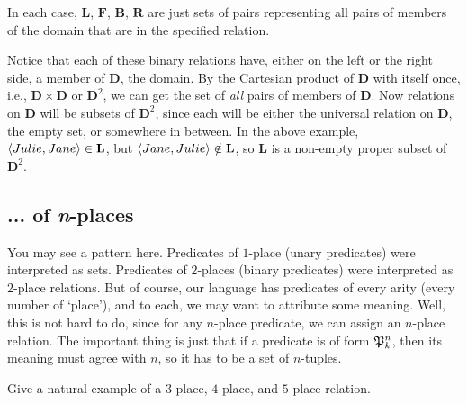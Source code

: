 In each case, $\mathbf{L}$, $\mathbf{F}$, $\mathbf{B}$, $\mathbf{R}$ are just sets of pairs representing all pairs of members of the domain that are in the specified relation. 

Notice that each of these binary relations have, either on the left or the right side, a member of $\mathbf{D}$, the domain. By the Cartesian product of $\mathbf{D}$ with itself once, i.e., $\mathbf{D} \times \mathbf{D}$ or $\mathbf{D}^2$, we can get the set of \textit{all} pairs of members of $\mathbf{D}$. Now relations on $\mathbf{D}$ will be subsets of $\mathbf{D}^2$, since each will be either the universal relation on $\mathbf{D}$, the empty set, or somewhere in between. In the above example, $\langle Julie, Jane\rangle \in \mathbf{L}$, but $\langle Jane, Julie\rangle \notin \mathbf{L}$, so $\mathbf{L}$ is a non-empty proper subset of $\mathbf{D}^2$.


\subsection{... of \emph{n}-places}

You may see a pattern here. Predicates of $1$-place (unary predicates) were interpreted as sets. Predicates of $2$-places (binary predicates) were interpreted as $2$-place relations. But of course, our language has predicates of every arity (every number of `place'), and to each, we may want to attribute some meaning. Well, this is not hard to do, since for any $n$-place predicate, we can assign an $n$-place relation. The important thing is just that if a predicate is of form $\mathfrak{P}^{n}_{k}$, then its meaning must agree with $n$, so it has to be a set of $n$-tuples. 

\begin{exc}
Give a natural example of a $3$-place, $4$-place, and $5$-place relation. 
\end{exc}

